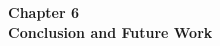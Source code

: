 \begin{center}

    \thispagestyle{empty}
    \vspace*{\fill}
    
    \Huge 
    \textbf{Chapter 6\\ Conclusion and Future Work}
       

    \vspace*{\fill}
\end{center}